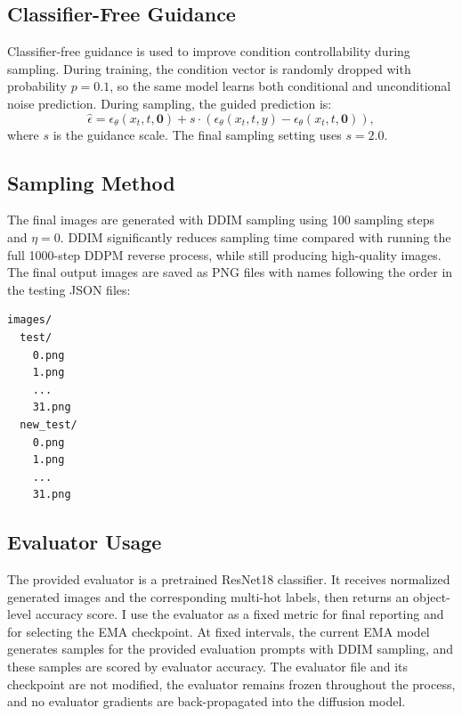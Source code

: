 \documentclass[12pt,a4paper]{article}
\begin{document}
\subsection{Classifier-Free Guidance}

Classifier-free guidance is used to improve condition controllability during
sampling.  During training, the condition vector is randomly dropped with
probability $p=0.1$, so the same model learns both conditional and unconditional
noise prediction.  During sampling, the guided prediction is:
\[
    \hat{\epsilon}
    =
    \epsilon_{\theta}(x_t,t,\mathbf{0})
    +
    s \cdot
    \left(
        \epsilon_{\theta}(x_t,t,y)
        -
        \epsilon_{\theta}(x_t,t,\mathbf{0})
    \right),
\]
where $s$ is the guidance scale.  The final sampling setting uses
$s=2.0$.

\subsection{Sampling Method}

The final images are generated with DDIM sampling using 100 sampling steps and
$\eta=0$.  DDIM significantly reduces sampling time compared with running the
full 1000-step DDPM reverse process, while still producing high-quality images.
The final output images are saved as PNG files with names following the order
in the testing JSON files:
\begin{lstlisting}[language=bash]
images/
  test/
    0.png
    1.png
    ...
    31.png
  new_test/
    0.png
    1.png
    ...
    31.png
\end{lstlisting}

\subsection{Evaluator Usage}

The provided evaluator is a pretrained ResNet18 classifier.  It receives
normalized generated images and the corresponding multi-hot labels, then
returns an object-level accuracy score.  I use the evaluator as a fixed metric
for final reporting and for selecting the EMA checkpoint.  At fixed intervals,
the current EMA model generates samples for the provided evaluation prompts
with DDIM sampling, and these samples are scored by evaluator accuracy.  The
evaluator file and its checkpoint are not modified, the evaluator remains
frozen throughout the process, and no evaluator gradients are back-propagated
into the diffusion model.
\end{document}
